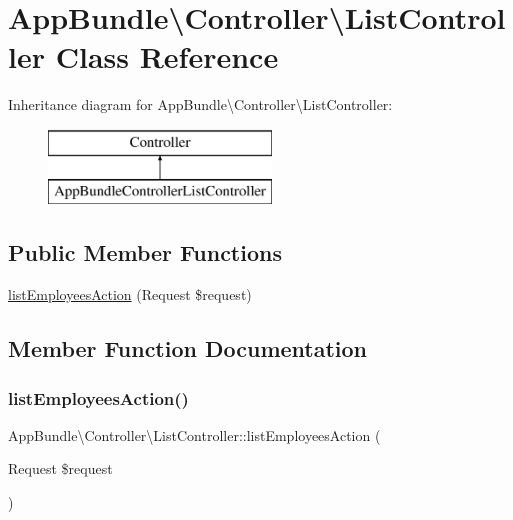 \hypertarget{class_app_bundle_1_1_controller_1_1_list_controller}{}\section{App\+Bundle\textbackslash{}Controller\textbackslash{}List\+Controller Class Reference}
\label{class_app_bundle_1_1_controller_1_1_list_controller}
Inheritance diagram for App\+Bundle\textbackslash{}Controller\textbackslash{}List\+Controller\+:\begin{figure}[H]
\begin{center}
\leavevmode
\includegraphics[height=2.000000cm]{class_app_bundle_1_1_controller_1_1_list_controller}
\end{center}
\end{figure}
\subsection*{Public Member Functions}
\begin{DoxyCompactItemize}
\item 
\mbox{\hyperlink{class_app_bundle_1_1_controller_1_1_list_controller_a6df066ca96b72968bf40cfed9d58a010}{list\+Employees\+Action}} (Request \$request)
\end{DoxyCompactItemize}


\subsection{Member Function Documentation}
\mbox{\label{class_app_bundle_1_1_controller_1_1_list_controller_a6df066ca96b72968bf40cfed9d58a010}} 
\subsubsection{\texorpdfstring{list\+Employees\+Action()}{listEmployeesAction()}}
{\footnotesize\ttfamily App\+Bundle\textbackslash{}\+Controller\textbackslash{}\+List\+Controller\+::list\+Employees\+Action (\begin{DoxyParamCaption}\item[{Request}]{\$request }\end{DoxyParamCaption})}

